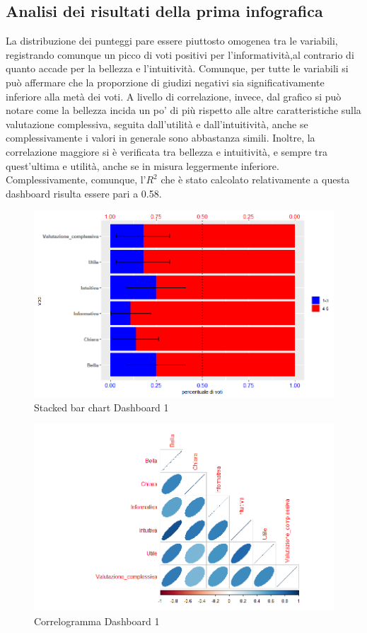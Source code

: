\documentclass[12pt]{article}
\begin{document}
\subsection{Analisi dei risultati della prima infografica}
La distribuzione dei punteggi pare essere piuttosto omogenea tra le variabili, registrando comunque un picco di voti positivi per l'informatività,al contrario di quanto accade per la  bellezza e l'intuitività. Comunque, per tutte le variabili si può affermare che la proporzione di giudizi negativi sia significativamente inferiore alla metà dei voti.
A livello di correlazione, invece, dal grafico si può notare come la bellezza incida un po' di più rispetto alle altre caratteristiche sulla valutazione complessiva, seguita dall'utilità e dall'intuitività, anche se complessivamente i valori in generale sono abbastanza simili. Inoltre, la correlazione maggiore si è verificata tra bellezza e intuitività, e sempre tra quest'ultima e utilità, anche se in misura leggermente inferiore. Complessivamente, comunque, l'$R^2$ che è stato calcolato relativamente a questa dashboard risulta essere pari a 0.58.
\begin{figure}[H]
    \centering
    \includegraphics[scale = 0.6]{img/Questionari/StackedBarplot_1.png}
    \caption{Stacked bar chart Dashboard 1}
\end{figure}


\begin{figure}[H]
    \hspace{20pt}
    \vspace{-20pt}
    \includegraphics[scale = 0.6]{img/Questionari/Correlogramma_1.png}
    \caption{Correlogramma Dashboard 1}
\end{figure}
\end{document}
